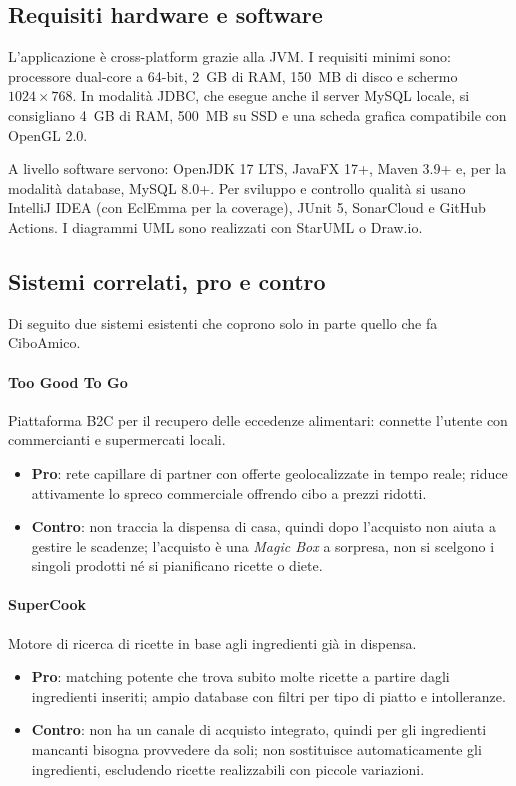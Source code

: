 \subsection{Requisiti hardware e software}
\label{subsec:requisiti_hw_sw}

L'applicazione è cross-platform grazie alla JVM. I requisiti minimi sono: processore dual-core a 64-bit, 2~GB di RAM, 150~MB di disco e schermo $1024\times768$. In modalità JDBC, che esegue anche il server MySQL locale, si consigliano 4~GB di RAM, 500~MB su SSD e una scheda grafica compatibile con OpenGL 2.0.

A livello software servono: OpenJDK 17 LTS, JavaFX 17+, Maven 3.9+ e, per la modalità database, MySQL 8.0+. Per sviluppo e controllo qualità si usano IntelliJ IDEA (con EclEmma per la coverage), JUnit 5, SonarCloud e GitHub Actions. I diagrammi UML sono realizzati con StarUML o Draw.io.

\subsection{Sistemi correlati, pro e contro}
\label{subsec:relazionati}

Di seguito due sistemi esistenti che coprono solo in parte quello che fa CiboAmico.

\paragraph{Too Good To Go}
Piattaforma B2C per il recupero delle eccedenze alimentari: connette l'utente con commercianti e supermercati locali.
\begin{itemize}
    \item \textbf{Pro}: rete capillare di partner con offerte geolocalizzate in tempo reale; riduce attivamente lo spreco commerciale offrendo cibo a prezzi ridotti.
    \item \textbf{Contro}: non traccia la dispensa di casa, quindi dopo l'acquisto non aiuta a gestire le scadenze; l'acquisto è una \emph{Magic Box} a sorpresa, non si scelgono i singoli prodotti né si pianificano ricette o diete.
\end{itemize}

\paragraph{SuperCook}
Motore di ricerca di ricette in base agli ingredienti già in dispensa.
\begin{itemize}
    \item \textbf{Pro}: matching potente che trova subito molte ricette a partire dagli ingredienti inseriti; ampio database con filtri per tipo di piatto e intolleranze.
    \item \textbf{Contro}: non ha un canale di acquisto integrato, quindi per gli ingredienti mancanti bisogna provvedere da soli; non sostituisce automaticamente gli ingredienti, escludendo ricette realizzabili con piccole variazioni.
\end{itemize}


